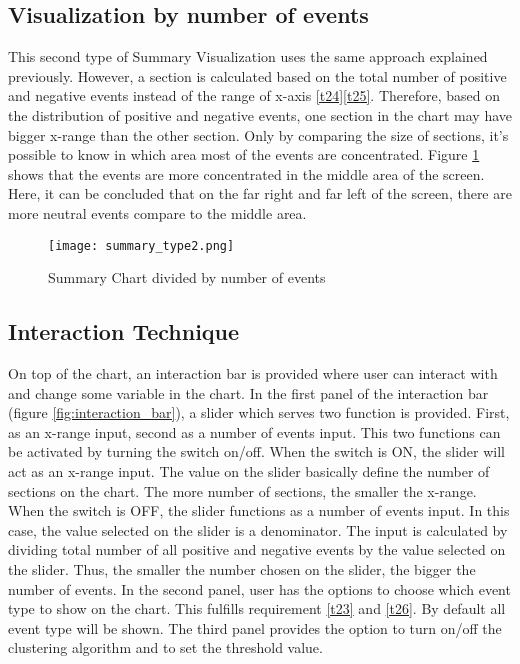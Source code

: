 \subsection{Visualization by number of events}
This second type of Summary Visualization uses the same approach explained previously. However, a section is calculated based on the total number of positive and negative events instead of the range of x-axis \ref{t24}\ref{t25}. Therefore, based on the distribution of positive and negative events, one section in the chart may have bigger x-range than the other section. Only by comparing the size of sections, it's possible to know in which area most of the events are concentrated. Figure \ref{fig:type2} shows that the events are more concentrated in the middle area of the screen. Here, it can be concluded that on the far right and far left of the screen, there are more neutral events compare to the middle area.

\begin{figure}
\centering
\texttt{[image: summary\_type2.png]}
\caption{Summary Chart divided by number of events}
\label{fig:type2}
\end{figure}

\subsection{Interaction Technique}
On top of the chart, an interaction bar is provided where user can interact with and change some variable in the chart. In the first panel of the interaction bar (figure \ref{fig:interaction_bar}), a slider which serves two function is provided. First, as an x-range input, second as a number of events input. This two functions can be activated by turning the switch on/off. When the switch is ON, the slider will act as an x-range input. The value on the slider basically define the number of sections on the chart. The more number of sections, the smaller the x-range. When the switch is OFF, the slider functions as a number of events input. In this case, the value selected on the slider is a denominator. The input is calculated by dividing total number of all positive and negative events by the value selected on the slider. Thus, the smaller the number chosen on the slider, the bigger the number of events. In the second panel, user has the options to choose which event type to show on the chart. This fulfills requirement \ref{t23} and \ref{t26}. By default all event type will be shown. The third panel provides the option to turn on/off the clustering algorithm and to set the threshold value.

